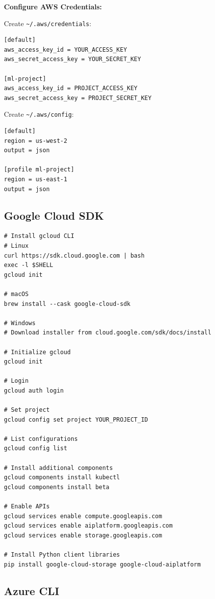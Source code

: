 \textbf{Configure AWS Credentials:}

Create \texttt{\textasciitilde/.aws/credentials}:
\begin{lstlisting}[style=shell]
[default]
aws_access_key_id = YOUR_ACCESS_KEY
aws_secret_access_key = YOUR_SECRET_KEY

[ml-project]
aws_access_key_id = PROJECT_ACCESS_KEY
aws_secret_access_key = PROJECT_SECRET_KEY
\end{lstlisting}

Create \texttt{\textasciitilde/.aws/config}:
\begin{lstlisting}[style=shell]
[default]
region = us-west-2
output = json

[profile ml-project]
region = us-east-1
output = json
\end{lstlisting}

\subsection{Google Cloud SDK}

\begin{lstlisting}[style=shell]
# Install gcloud CLI
# Linux
curl https://sdk.cloud.google.com | bash
exec -l $SHELL
gcloud init

# macOS
brew install --cask google-cloud-sdk

# Windows
# Download installer from cloud.google.com/sdk/docs/install

# Initialize gcloud
gcloud init

# Login
gcloud auth login

# Set project
gcloud config set project YOUR_PROJECT_ID

# List configurations
gcloud config list

# Install additional components
gcloud components install kubectl
gcloud components install beta

# Enable APIs
gcloud services enable compute.googleapis.com
gcloud services enable aiplatform.googleapis.com
gcloud services enable storage.googleapis.com

# Install Python client libraries
pip install google-cloud-storage google-cloud-aiplatform
\end{lstlisting}

\subsection{Azure CLI}


